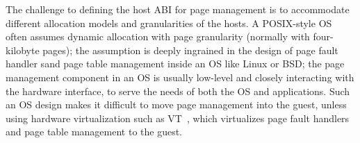 The challenge to defining the host ABI for page management
is to accommodate different allocation models and granularities of the hosts.
A POSIX-style OS often assumes dynamic allocation with page granularity (normally with four-kilobyte pages);
the assumption is deeply ingrained in the design of page fault handler sand page table management
inside an OS like Linux or BSD;
the page management component in an OS
is usually low-level and closely interacting with the hardware interface,
to serve the needs of both the OS and applications.
Such an OS design makes it difficult to move page management
into the guest, unless using hardware virtualization such as
VT~\cite{VT}, which virtualizes page fault handlers and page table management to the guest.




